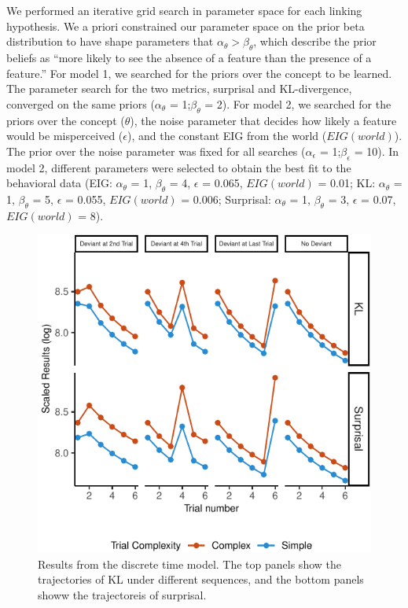 \documentclass[10pt, letterpaper]{article}
\newenvironment{CodeChunk}{}{}
\begin{document}
We performed an iterative grid search in parameter space for each
linking hypothesis. We a priori constrained our parameter space on the
prior beta distribution to have shape parameters that
\(\alpha_{\theta} > \beta_{\theta}\), which describe the prior beliefs
as ``more likely to see the absence of a feature than the presence of a
feature.'' For model 1, we searched for the priors over the concept to
be learned. The parameter search for the two metrics, surprisal and
KL-divergence, converged on the same priors (\(\alpha_{\theta}\) =
1;\(\beta_{\theta}\) = 2). For model 2, we searched for the priors over
the concept (\(\theta\)), the noise parameter that decides how likely a
feature would be misperceived (\(\epsilon\)), and the constant EIG from
the world (\(EIG(world)\)). The prior over the noise parameter was fixed
for all searches (\(\alpha_{\epsilon}\) = 1;\(\beta_{\epsilon}\) = 10).
In model 2, different parameters were selected to obtain the best fit to
the behavioral data (EIG: \(\alpha_{\theta}\) = 1, \(\beta_{\theta}\) =
4, \(\epsilon\) = 0.065, \(EIG(world)\) = 0.01; KL: \(\alpha_{\theta}\)
= 1, \(\beta_{\theta}\) = 5, \(\epsilon\) = 0.055, \(EIG(world)\) =
0.006; Surprisal: \(\alpha_{\theta}\) = 1, \(\beta_{\theta}\) = 3,
\(\epsilon\) = 0.07, \(EIG(world)\) = 8).

\begin{CodeChunk}
\begin{figure}[H]

{\centering \includegraphics{figs/basic_result-1} 

}

\caption[Results from the discrete time model]{Results from the discrete time model. The top panels show the trajectories of KL under different sequences, and the bottom panels showw the trajectoreis of surprisal.}\label{fig:basic_result}
\end{figure}
\end{CodeChunk}
\end{document}
